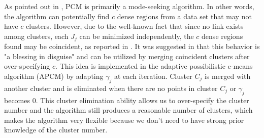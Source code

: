\documentclass[journal]{IEEEtran}
\begin{document}
As pointed out in \cite{krishnapuram_possibilistic_1996}, PCM is primarily a mode-seeking algorithm. In other words, the algorithm can potentially find $c$ dense regions from a data set that may not have $c$ clusters. However, due to the well-known fact that since no link exists among clusters, each $J_j$ can be minimized independently, the $c$ dense regions found may be coincident, as reported in \cite{barni_comments_1996}. It was suggested in \cite{krishnapuram_possibilistic_1996} that this behavior is "a blessing in disguise" and can be utilized by merging coincident clusters after over-specifying $c$. This idea is implemented in the adaptive possibilistic c-means algorithm (APCM) \cite{xenaki_novel_2016} by adapting $\gamma_j$ at each iteration. Cluster $C_j$ is merged with another cluster and is eliminated when there are no points in cluster $C_j$ or $\gamma_j$ becomes $0$. This cluster elimination ability allows us to over-specify the cluster number and the algorithm still produces a reasonable number of clusters, which makes the algorithm very flexible because we don't need to have strong prior knowledge of the cluster number.
\end{document}
